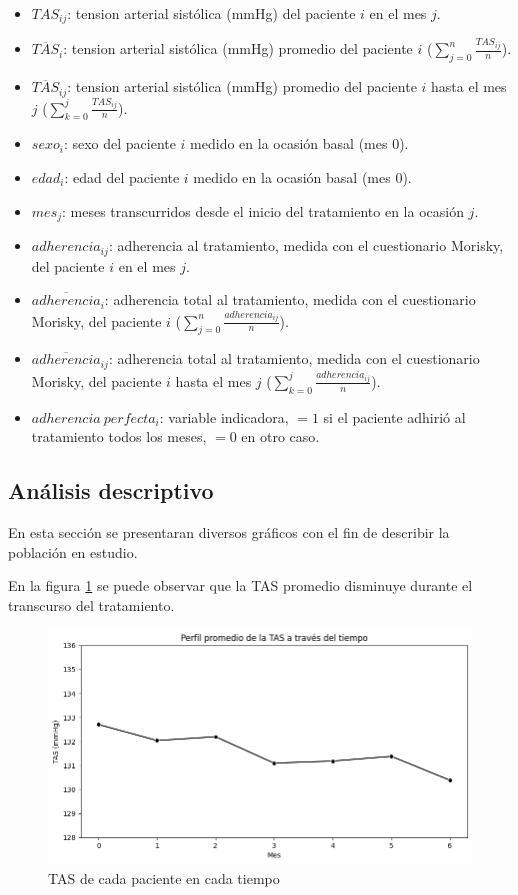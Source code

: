 \documentclass[spanish]{article}
\numberwithin{figure}{subsection}
\numberwithin{equation}{subsection}
\numberwithin{table}{subsection}
\begin{document}
\begin{itemize}
	\item $TAS_{ij}$: tension arterial sistólica (mmHg) del paciente $i$ en el
	mes $j$.
	\item $\overline{TAS}_{i}$: tension arterial sistólica (mmHg) promedio del
	paciente $i$ ($\sum_{j=0}^n \frac{TAS_{ij}}{n}$).
	\item $\overline{TAS}_{ij}$: tension arterial sistólica (mmHg) promedio del
	paciente $i$ hasta el mes $j$ ($\sum_{k=0}^j \frac{TAS_{ij}}{n}$).
	\item $sexo_i$: sexo del paciente $i$ medido en la ocasión basal (mes 0).
	\item $edad_i$: edad del paciente $i$ medido en la ocasión basal (mes 0).
	\item $mes_j$: meses transcurridos desde el inicio del tratamiento en la
	ocasión $j$.
	\item $adherencia_{ij}$: adherencia al tratamiento, medida con el
	cuestionario Morisky, del paciente $i$ en el mes $j$.
	\item $\overline{adherencia}_i$: adherencia total al tratamiento, medida con
	el cuestionario Morisky, del paciente $i$ ($\sum_{j=0}^n
	\frac{adherencia_{ij}}{n}$).
	\item $\overline{adherencia}_{ij}$: adherencia total al tratamiento, medida
	con el cuestionario Morisky, del paciente $i$ hasta el mes $j$
	($\sum_{k=0}^j \frac{adherencia_{ij}}{n}$).
	\item $adherencia\ perfecta_i$: variable indicadora, $=1$ si el paciente
	adhirió al tratamiento todos los meses, $=0$ en otro caso.
\end{itemize}

\subsection{Análisis descriptivo}

En esta sección se presentaran diversos gráficos con el fin de describir la
población en estudio.

En la figura \ref{TAS_vs_tpo} se puede observar que la TAS promedio disminuye
durante el transcurso del tratamiento.

\begin{figure}[H]
	\centering
	\includegraphics[scale=0.5]{img/TAS_vs_tpo.png}
	\caption{TAS de cada paciente en cada tiempo}
	\label{TAS_vs_tpo}
\end{figure}
\end{document}
